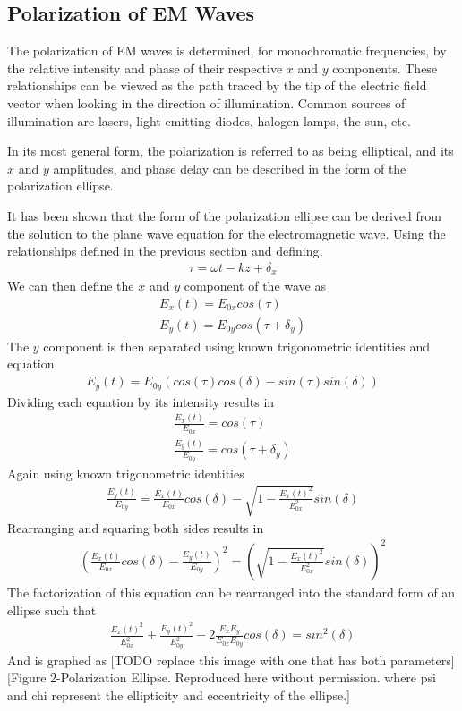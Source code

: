 \subsection{Polarization of EM Waves}
The polarization of EM waves is determined, for monochromatic frequencies, by the relative intensity and phase of their respective $x$ and $y$ components.  These relationships can be viewed as the path traced by the tip of the electric field vector when looking in the direction of illumination.  Common sources of illumination are lasers, light emitting diodes, halogen lamps, the sun, etc.

In its most general form, the polarization is referred to as being elliptical, and its $x$ and $y$ amplitudes, and phase delay can be described in the form of the polarization ellipse.

It has been shown that the form of the polarization ellipse can be derived from the solution to the plane wave equation for the electromagnetic wave.  Using the relationships defined in the previous section and defining,
%
\begin{align}
    \tau=\omega t-kz+\delta_x
\end{align}
%
We can then define the $x$ and $y$ component of the wave as
%
\begin{align}
	E_x (t)=E_{0x} cos(\tau)\\
	E_y (t)=E_{0y} cos(\tau+\delta_y )
\end{align}
%
The $y$ component is then separated using known trigonometric identities and equation
%
\begin{align}
E_y (t)=E_{0y} (cos(\tau) cos(\delta)-sin(\tau)sin(\delta))
\end{align}
%
Dividing each equation by its intensity results in
%
\begin{align}
    \frac{E_x (t)}{E_{0x}} =cos(\tau) \\
    \frac{E_y (t)}{E_{0y}} =cos(\tau+\delta_y )
\end{align}
%
Again using known trigonometric identities
%
\begin{align}
    \frac{E_y (t)}{E_{0y}} = \frac{E_x (t)}{E_{0x}}   cos(\delta)-\sqrt{1-\frac{E_x (t)^2}{E_{0x}^2} } sin(\delta)
\end{align}
%
Rearranging and squaring both sides results in
%
\begin{align}
    (\frac{E_x (t)}{E_{0x}}   cos(\delta)-\frac{E_y (t)}{E_{0y}} )^2=(\sqrt{1-\frac{E_x (t)^2}{E_{0x}^2} } sin(\delta))^2
\end{align}
%
The factorization of this equation can be rearranged into the standard form of an ellipse such that
%
\begin{align}
    \frac{E_x (t)^2}{E_{0x}^2} +\frac{E_y (t)^2}{E_{0y}^2} -2 \frac{E_x E_y}{E_{0x} E_{0y} } cos(\delta)=sin^2 (\delta)
\end{align}
%
And is graphed as
[TODO replace this image with one that has both parameters]
[Figure 2-Polarization Ellipse. Reproduced here without permission.
where psi and chi represent the ellipticity and eccentricity of the ellipse.]


